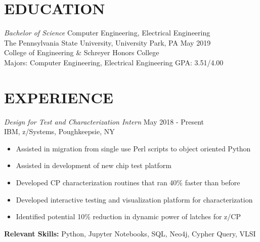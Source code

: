 \documentclass[line,margin]{res}
\begin{document}
	\address{235 S. Buckhout St. State College, PA 16801}
	\address{(484) 904-2099}
	
	\begin{resume}
		
		\section{EDUCATION}{\sl Bachelor of Science} Computer Engineering, Electrical Engineering \\
		The Pennsylvania State University, University Park, PA \hfill May 2019\\
		College of Engineering \& Schreyer Honors College\\
		Majors: Computer Engineering, Electrical Engineering \hfill GPA: 3.51/4.00
		
		\section{EXPERIENCE}{\sl Design for Test and Characterization Intern} \hfill May 2018 - Present\\
		IBM, z/Systems, Poughkeepsie, NY
		\begin{itemize}  \itemsep -2pt
			\item Assisted in migration from single use Perl scripts to object oriented Python
			\item Assisted in development of new chip test platform
			\item Developed CP characterization routines that ran 40\% faster than before
			\item Developed interactive testing and visualization platform for characterization
			\item Identified potential 10\% reduction in dynamic power of latches for z/CP
			\vspace*{-\baselineskip}		
		\end{itemize}
		\textbf{Relevant Skills:} Python, Jupyter Notebooks, SQL, Neo4j, Cypher Query, VLSI
		\newline
		

\end{resume}
\end{document}
